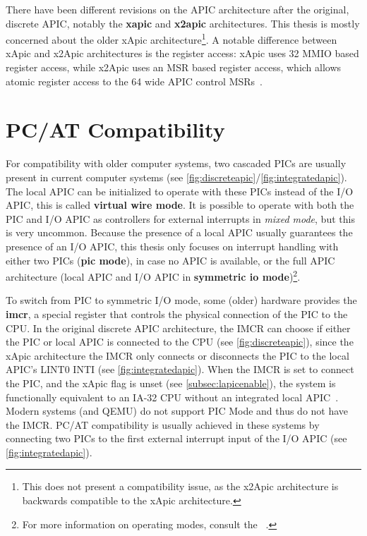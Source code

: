 There have been different revisions on the APIC architecture after the original, discrete APIC, notably the \textbf{\gls{xapic}} and \textbf{\gls{x2apic}} architectures.
This thesis is mostly concerned about the older xApic architecture\footnote{
  This does not present a compatibility issue, as the x2Apic architecture is backwards compatible to the xApic architecture.}.
A notable difference between xApic and x2Apic architectures is the register access: xApic uses \SI{32}{\bit} MMIO based register access, while x2Apic uses an MSR based register access, which allows atomic register access to the \SI{64}{\bit} wide APIC control MSRs~\autocite[sec.~3.11.12]{ia32}.

\section{PC/AT Compatibility}
\label{sec:pcatcompat}

For compatibility with older computer systems, two cascaded PICs are usually present in current computer systems (see \autoref{fig:discreteapic}/\autoref{fig:integratedapic}).
The local APIC can be initialized to operate with these PICs instead of the I/O APIC, this is called \textbf{\gls{virtual wire mode}}.
It is possible to operate with both the PIC and I/O APIC as controllers for external interrupts in \textit{mixed mode}, but this is very uncommon.
Because the presence of a local APIC usually guarantees the presence of an I/O APIC, this thesis only focuses on interrupt handling with either two PICs (\textbf{\gls{pic mode}}), in case no APIC is available, or the full APIC architecture (local APIC and I/O APIC in \textbf{\gls{symmetric io mode}})\footnote{
  For more information on operating modes, consult the ~\autocite[sec.~3.6.2.1]{mpspec}.}.

To switch from PIC to symmetric I/O mode, some (older) hardware provides the \textbf{\gls{imcr}}, a special register that controls the physical connection of the PIC to the CPU\@.
In the original discrete APIC architecture, the IMCR can choose if either the PIC or local APIC is connected to the CPU (see \autoref{fig:discreteapic}), since the xApic architecture the IMCR only connects or disconnects the PIC to the local APIC's LINT0 INTI (see \autoref{fig:integratedapic}).
When the IMCR is set to connect the PIC, and the xApic  flag is unset (see \autoref{subsec:lapicenable}), the system is functionally equivalent to an IA-32 CPU without an integrated local APIC~\autocite[sec.~3.11.4.3]{ia32}.
Modern systems (and QEMU) do not support PIC Mode and thus do not have the IMCR\@.
PC/AT compatibility is usually achieved in these systems by connecting two PICs to the first external interrupt input of the I/O APIC (see \autoref{fig:integratedapic}).

